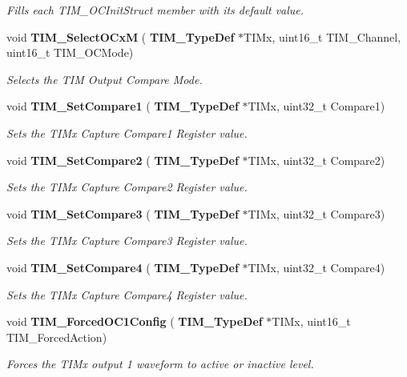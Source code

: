 \begin{DoxyCompactItemize}
\begin{DoxyCompactList}\small\item\em Fills each T\+I\+M\+\_\+\+O\+C\+Init\+Struct member with its default value. \end{DoxyCompactList}\item 
void \textbf{ T\+I\+M\+\_\+\+Select\+O\+CxM} (\textbf{ T\+I\+M\+\_\+\+Type\+Def} $\ast$T\+I\+Mx, uint16\+\_\+t T\+I\+M\+\_\+\+Channel, uint16\+\_\+t T\+I\+M\+\_\+\+O\+C\+Mode)
\begin{DoxyCompactList}\small\item\em Selects the T\+IM Output Compare Mode. \end{DoxyCompactList}\item 
void \textbf{ T\+I\+M\+\_\+\+Set\+Compare1} (\textbf{ T\+I\+M\+\_\+\+Type\+Def} $\ast$T\+I\+Mx, uint32\+\_\+t Compare1)
\begin{DoxyCompactList}\small\item\em Sets the T\+I\+Mx Capture Compare1 Register value. \end{DoxyCompactList}\item 
void \textbf{ T\+I\+M\+\_\+\+Set\+Compare2} (\textbf{ T\+I\+M\+\_\+\+Type\+Def} $\ast$T\+I\+Mx, uint32\+\_\+t Compare2)
\begin{DoxyCompactList}\small\item\em Sets the T\+I\+Mx Capture Compare2 Register value. \end{DoxyCompactList}\item 
void \textbf{ T\+I\+M\+\_\+\+Set\+Compare3} (\textbf{ T\+I\+M\+\_\+\+Type\+Def} $\ast$T\+I\+Mx, uint32\+\_\+t Compare3)
\begin{DoxyCompactList}\small\item\em Sets the T\+I\+Mx Capture Compare3 Register value. \end{DoxyCompactList}\item 
void \textbf{ T\+I\+M\+\_\+\+Set\+Compare4} (\textbf{ T\+I\+M\+\_\+\+Type\+Def} $\ast$T\+I\+Mx, uint32\+\_\+t Compare4)
\begin{DoxyCompactList}\small\item\em Sets the T\+I\+Mx Capture Compare4 Register value. \end{DoxyCompactList}\item 
void \textbf{ T\+I\+M\+\_\+\+Forced\+O\+C1\+Config} (\textbf{ T\+I\+M\+\_\+\+Type\+Def} $\ast$T\+I\+Mx, uint16\+\_\+t T\+I\+M\+\_\+\+Forced\+Action)
\begin{DoxyCompactList}\small\item\em Forces the T\+I\+Mx output 1 waveform to active or inactive level. \end{DoxyCompactList}\item 

\end{DoxyCompactItemize}
